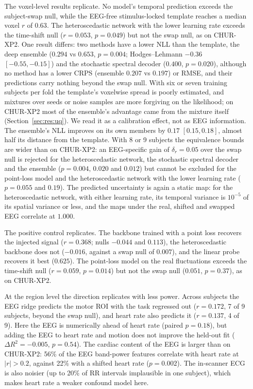 The voxel-level results replicate. No model's temporal prediction exceeds the subject-swap null, while the EEG-free stimulus-locked template reaches a median voxel $r$ of $0.63$. The heteroscedastic network with the lower learning rate exceeds the time-shift null ($r=0.053$, $p=0.049$) but not the swap null, as on CHUR-XP2. One result differs: two methods have a lower NLL than the template, the deep ensemble ($0.294$ vs $0.653$, $p=0.004$; Hodges--Lehmann $-0.36$ $[-0.55, -0.15]$) and the stochastic spectral decoder ($0.400$, $p=0.020$), although no method has a lower CRPS (ensemble $0.207$ vs $0.197$) or RMSE, and their predictions carry nothing beyond the swap null. With six or seven training subjects per fold the template's voxelwise spread is poorly estimated, and mixtures over seeds or noise samples are more forgiving on the likelihood; on CHUR-XP2 most of the ensemble's advantage came from the mixture itself (Section~\ref{sec:res:uq}). We read it as a calibration effect, not as EEG information. The ensemble's NLL improves on its own members by $0.17$ $[0.15, 0.18]$, almost half its distance from the template. With 8 or 9 subjects the equivalence bounds are wider than on CHUR-XP2: an EEG-specific gain of $\delta_r=0.05$ over the swap null is rejected for the heteroscedastic network, the stochastic spectral decoder and the ensemble ($p=0.004$, $0.020$ and $0.012$) but cannot be excluded for the point-loss model and the heteroscedastic network with the lower learning rate ($p=0.055$ and $0.19$). The predicted uncertainty is again a static map: for the heteroscedastic network, with either learning rate, its temporal variance is $10^{-5}$ of its spatial variance or less, and the maps under the real, shifted and swapped EEG correlate at $1.000$.

The positive control replicates. The backbone trained with a point loss recovers the injected signal ($r=0.368$; nulls $-0.044$ and $0.113$), the heteroscedastic backbone does not ($-0.016$, against a swap null of $0.007$), and the linear probe recovers it best ($0.625$). The point-loss model on the real fluctuations exceeds the time-shift null ($r=0.059$, $p=0.014$) but not the swap null ($0.051$, $p=0.37$), as on CHUR-XP2.

At the region level the direction replicates with less power. Across subjects the EEG ridge predicts the motor ROI with the task regressed out ($r=0.172$, 7 of 9 subjects, beyond the swap null), and heart rate also predicts it ($r=0.137$, 4 of 9). Here the EEG is numerically ahead of heart rate (paired $p=0.18$), but adding the EEG to heart rate and motion does not improve the held-out fit ($\Delta R^2=-0.005$, $p=0.54$). The cardiac content of the EEG is larger than on CHUR-XP2: 56\% of the EEG band-power features correlate with heart rate at $|r|>0.2$, against 22\% with a shifted heart rate ($p=0.002$). The in-scanner ECG is also noisier (up to 20\% of RR intervals implausible in one subject), which makes heart rate a weaker confound model here.



